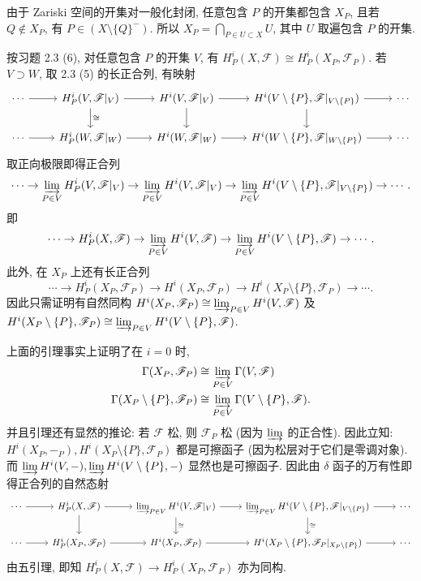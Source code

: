 \documentclass{article}
\theoremstyle{exercise}
\theoremstyle{plain}
\theoremstyle{remark}
\newenvironment{proofc}{\proof}{\endproof}
\def\cF{\mathscr{F}}
\begin{document}
\begin{proofc}[习题 2.5 的证明]
  由于 Zariski 空间的开集对一般化封闭, 任意包含 $P$ 的开集都包含 $X_P$,
  且若 $Q \notin X_P$, 有 $P \in (X \setminus \{Q\}^-)$.
  所以 $X_P = \bigcap_{P \in U \subset X} U$, 其中 $U$ 取遍包含 $P$ 的开集.

  按习题 2.3 (6), 对任意包含 $P$ 的开集 $V$, 有 $H_P^i(X, \cF) \cong H_P^i(X_P, \cF_P)$.
  若 $V \supset W$, 取 2.3 (5) 的长正合列, 有映射
  \[
    \begin{tikzcd}
      \cdots \ar[r] & H_P^i(V, \cF|_V) \ar[r] \ar[d, "\cong"]
      & H^i(V, \cF|_V) \ar[r] \ar[d] & H^i(V \setminus \{P\}, \cF|_{V \setminus \{P\}}) \ar[r] \ar[d] & \cdots\\
      \cdots \ar[r] & H_P^i(W, \cF|_W) \ar[r]
      & H^i(W, \cF|_W) \ar[r] & H^i(W \setminus \{P\}, \cF|_{W \setminus \{P\}}) \ar[r] & \cdots
    \end{tikzcd}
  \]
  取正向极限即得正合列
  \[
    \cdots \to \varinjlim_{P \in V} H_P^i(V, \cF|_V)
    \to \varinjlim_{P \in V} H^i(V, \cF|_V)
    \to \varinjlim_{P \in V} H^i(V \setminus \{P\}, \cF|_{V \setminus \{P\}})
    \to \cdots.
  \]
  即
  \[
    \cdots \to H_P^i(X, \cF)
    \to \varinjlim_{P \in V} H^i(V, \cF)
    \to \varinjlim_{P \in V} H^i(V \setminus \{P\}, \cF)
    \to \cdots.
  \]
  此外, 在 $X_P$ 上还有长正合列
  \[
    \cdots \to H_P^i(X_P, \cF_P) \to H^i(X_P, \cF_P) \to H^i(X_P \setminus \{P\}, \cF_P) \to \cdots.
  \]
  因此只需证明有自然同构 $H^i(X_P, \cF_P) \cong \varinjlim_{P \in V} H^i(V, \cF)$
  及 $H^i(X_P \setminus \{P\}, \cF_P) \cong \varinjlim_{P \in V} H^i(V \setminus \{P\}, \cF)$.

  上面的引理事实上证明了在 $i = 0$ 时,
  \begin{align*}
    \Gamma(X_P, \cF_P) &\cong \varinjlim_{P \in V} \Gamma(V, \cF) \\
    \Gamma(X_P \setminus \{P\}, \cF_P) &\cong \varinjlim_{P \in V} \Gamma(V \setminus \{P\}, \cF).
  \end{align*}
  并且引理还有显然的推论: 若 $\cF$ 松, 则 $\cF_P$ 松 (因为 $\varinjlim$ 的正合性).
  因此立知: $H^i(X_P, -_P), H^i(X_P \setminus \{P\}, \cF_P)$ 都是可擦函子 (因为松层对于它们是零调对象).
  而 $\varinjlim H^i(V, -), \varinjlim H^i(V \setminus \{P\}, -)$ 显然也是可擦函子.
  因此由 $\delta$ 函子的万有性即得正合列的自然态射
  \[
    \begin{tikzcd}
      \cdots \ar[r] & H_P^i(X, \cF) \ar[r] \ar[d]
      & \varinjlim_{P \in V} H^i(V, \cF|_V) \ar[r] \ar[d, "\cong"]
      & \varinjlim_{P \in V} H^i(V \setminus \{P\}, \cF|_{V \setminus \{P\}}) \ar[r] \ar[d, "\cong"] & \cdots\\
      \cdots \ar[r] & H_P^i(X_P, \cF_P) \ar[r]
      & H^i(X_P, \cF_P) \ar[r] & H^i(X_P \setminus \{P\}, \cF_P|_{X_P \setminus \{P\}}) \ar[r] & \cdots
    \end{tikzcd}
  \]
  由五引理, 即知 $H_P^i(X, \cF) \to H_P^i(X_P, \cF_P)$ 亦为同构.
\end{proofc}
\end{document}
